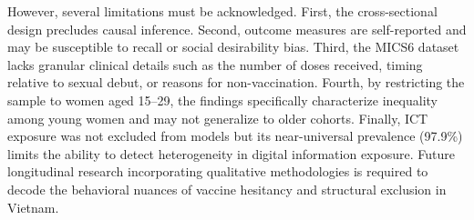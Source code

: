 However, several limitations must be acknowledged. First, the cross-sectional design precludes causal inference. Second, outcome measures are self-reported and may be susceptible to recall or social desirability bias. Third, the MICS6 dataset lacks granular clinical details such as the number of doses received, timing relative to sexual debut, or reasons for non-vaccination. Fourth, by restricting the sample to women aged 15--29, the findings specifically characterize inequality among young women and may not generalize to older cohorts. Finally, ICT exposure was not excluded from models but its near-universal prevalence (97.9\%) limits the ability to detect heterogeneity in digital information exposure. Future longitudinal research incorporating qualitative methodologies is required to decode the behavioral nuances of vaccine hesitancy and structural exclusion in Vietnam.